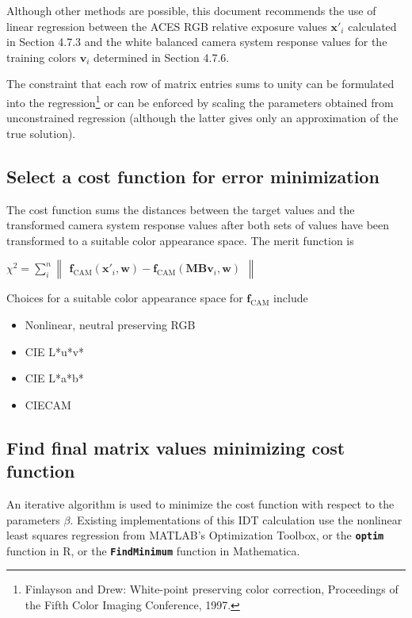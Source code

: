 Although other methods are possible, this document recommends the use of linear regression between the ACES RGB relative exposure values $\mathbf{x}'_i$ calculated in Section 4.7.3 and the white balanced camera system response values for the training colors $\mathbf{v}_i$ determined in Section 4.7.6.

The constraint that each row of matrix entries sums to unity can be formulated into the regression\footnote{Finlayson and Drew: White-point preserving color correction, Proceedings of the Fifth Color Imaging Conference, 1997.} or can be enforced by scaling the parameters obtained from unconstrained regression (although the latter gives only an approximation of the true solution).

\subsection{Select a cost function for error minimization}
\label{sec:compcostfn}
The cost function sums the distances between the target values and the transformed camera system response values after both sets of values have been transformed to a suitable color appearance space. The merit function is

$\chi^2=\displaystyle\sum_{i}^{n}\begin{Vmatrix}\mathbf{f}_{\mathrm{CAM}}(\mathbf{x}'_i,\mathbf{w})-\mathbf{f}_{\mathrm{CAM}}(\mathbf{MBv}_i,\mathbf{w})\end{Vmatrix}$
 
Choices for a suitable color appearance space for $\mathbf{f}_{\mathrm{CAM}}$ include

\begin{itemize}
	\item Nonlinear, neutral preserving RGB
	\item CIE L*u*v*
	\item CIE L*a*b*
	\item CIECAM

\end{itemize}



\subsection{Find final matrix values minimizing cost function}
\label{sec:compend}
An iterative algorithm is used to minimize the cost function with respect to the parameters $\beta$. Existing implementations of this IDT calculation use the nonlinear least squares regression from MATLAB's Optimization Toolbox, or the \textbf{\texttt{optim}} function in R, or the \textbf{\texttt{FindMinimum}} function in Mathematica.


